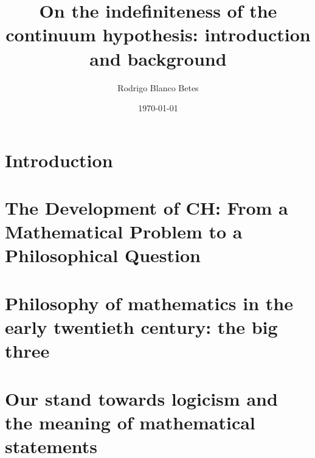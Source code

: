 \documentclass[11pt,a4paper]{article}
\title{\textbf{On the indefiniteness of the continuum hypothesis: introduction and background}}
\author{Rodrigo Blanco Betes}
\date{\today}
\begin{document}
\maketitle

\section*{Introduction}

\section{The Development of CH: From a Mathematical Problem to a Philosophical Question}

\section{Philosophy of mathematics in the early twentieth century: the big three}


\section{Our stand towards logicism and the meaning of mathematical statements}
\end{document}
